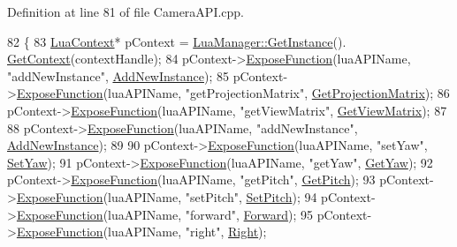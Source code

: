 Definition at line 81 of file Camera\+A\+P\+I.\+cpp.


\begin{DoxyCode}
82 \{
83     \hyperlink{class_lua_context}{LuaContext}* pContext = \hyperlink{class_singleton_a74f32751d99bf3cc95fe17aba11f4b07}{LuaManager::GetInstance}().
      \hyperlink{class_lua_manager_a68592b46a59219d130cf4f637c977378}{GetContext}(contextHandle);
84     pContext->\hyperlink{class_lua_context_a2229908b6b329ed67105f1be7409cb3f}{ExposeFunction}(luaAPIName, \textcolor{stringliteral}{"addNewInstance"}, 
      \hyperlink{class_camera_a_p_i_ad255bd03ff61394e3f9f70ffac703502}{AddNewInstance});
85     pContext->\hyperlink{class_lua_context_a2229908b6b329ed67105f1be7409cb3f}{ExposeFunction}(luaAPIName, \textcolor{stringliteral}{"getProjectionMatrix"}, 
      \hyperlink{class_camera_a_p_i_a122c014eeb4fa24ce1eef7154d1ec934}{GetProjectionMatrix});
86     pContext->\hyperlink{class_lua_context_a2229908b6b329ed67105f1be7409cb3f}{ExposeFunction}(luaAPIName, \textcolor{stringliteral}{"getViewMatrix"}, 
      \hyperlink{class_camera_a_p_i_a30cd699e6588dbbf5a993bee609e5c3a}{GetViewMatrix});
87 
88     pContext->\hyperlink{class_lua_context_a2229908b6b329ed67105f1be7409cb3f}{ExposeFunction}(luaAPIName, \textcolor{stringliteral}{"addNewInstance"}, 
      \hyperlink{class_camera_a_p_i_ad255bd03ff61394e3f9f70ffac703502}{AddNewInstance});
89 
90     pContext->\hyperlink{class_lua_context_a2229908b6b329ed67105f1be7409cb3f}{ExposeFunction}(luaAPIName, \textcolor{stringliteral}{"setYaw"}, \hyperlink{class_camera_a_p_i_a6ae15cbf0c1c5e97645ca6d9b4905b8f}{SetYaw});
91     pContext->\hyperlink{class_lua_context_a2229908b6b329ed67105f1be7409cb3f}{ExposeFunction}(luaAPIName, \textcolor{stringliteral}{"getYaw"}, \hyperlink{class_camera_a_p_i_a4525769d9d7fc4bd32c5dbd08e195ad4}{GetYaw});
92     pContext->\hyperlink{class_lua_context_a2229908b6b329ed67105f1be7409cb3f}{ExposeFunction}(luaAPIName, \textcolor{stringliteral}{"getPitch"}, \hyperlink{class_camera_a_p_i_abac2bbe6a37d2fa6d893b6360a9569a5}{GetPitch});
93     pContext->\hyperlink{class_lua_context_a2229908b6b329ed67105f1be7409cb3f}{ExposeFunction}(luaAPIName, \textcolor{stringliteral}{"setPitch"}, \hyperlink{class_camera_a_p_i_a1a0543bac7b9bb4edea16ce8c50e8fd8}{SetPitch});
94     pContext->\hyperlink{class_lua_context_a2229908b6b329ed67105f1be7409cb3f}{ExposeFunction}(luaAPIName, \textcolor{stringliteral}{"forward"}, \hyperlink{class_camera_a_p_i_aaf51389911812005f394aac2c4824a0e}{Forward});
95     pContext->\hyperlink{class_lua_context_a2229908b6b329ed67105f1be7409cb3f}{ExposeFunction}(luaAPIName, \textcolor{stringliteral}{"right"}, \hyperlink{class_camera_a_p_i_aa5880fe8e2c06187a7c2d51eeb84000d}{Right});

\end{DoxyCode}
